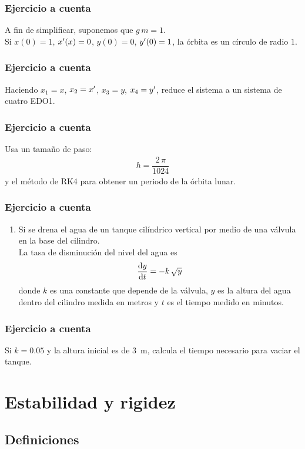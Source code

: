 \documentclass[12pt]{beamer}
\begin{document}
\begin{frame}
\frametitle{Ejercicio a cuenta}
A fin de simplificar, suponemos que $g \, m = 1$.
\\
\bigskip
Si $x (0) = 1$, ${x}^{\prime} (x) = 0$, $y (0) = 0$, ${y}^{\prime} (0) = 1$, la órbita es un círculo de radio $1$.
\end{frame}
\begin{frame}
\frametitle{Ejercicio a cuenta}
Haciendo $x_{1} = x$, $x_{2} = {x}^{\prime}$, $x_{3} = y$, $x_{4} = {y}^{\prime}$, reduce el sistema a un sistema de cuatro EDO1.
\end{frame}
\begin{frame}
\frametitle{Ejercicio a cuenta}
Usa un tamaño de paso:
\begin{align*}
h = \dfrac{2 \, \pi}{1024}
\end{align*}
y el método de RK4 para obtener un periodo de la órbita lunar.
\end{frame}
\begin{frame}
\frametitle{Ejercicio a cuenta}
\begin{enumerate}
\conti
\item Si se drena el agua de un tanque cilíndrico vertical por medio de una válvula en la base del cilindro. 
\\
\bigskip
La tasa de disminución del nivel del agua es
\begin{align*}
\dv{y}{t} = -k \, \sqrt{y}
\end{align*}
donde $k$ es una constante que depende de la válvula, $y$ es la altura del agua dentro del cilindro medida en metros y $t$ es el tiempo medido en minutos.
\end{enumerate}
\end{frame}
\begin{frame}
\frametitle{Ejercicio a cuenta}
Si $k = 0.05$ y la altura inicial es de \SI{3}{\meter}, calcula el tiempo necesario para vaciar el tanque.
\end{frame}

\section{Estabilidad y rigidez}
\subsection{Definiciones}
\end{document}
